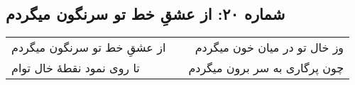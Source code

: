 \begin{center}
\section*{شماره ۲۰: از عشقِ خط تو سرنگون میگردم}
\label{sec:020}
\begin{longtable}{l p{0.5cm} r}
از عشقِ خط تو سرنگون میگردم
&&
وز خال تو در میان خون میگردم
\\
تا روی نمود نقطهٔ خال توام
&&
چون پرگاری به سر برون میگردم
\\
\end{longtable}
\end{center}
